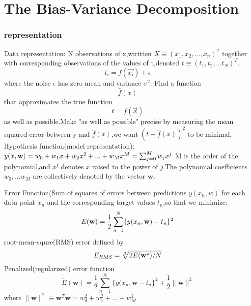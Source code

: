 \section{The Bias-Variance Decomposition}
\subsubsection{representation}
Data representation:
N observations of x,wiritten 
$X \equiv (x_1,x_2,...,x_n)^T$
together with corresponding observations of the values of t,denoted 
$t \equiv (t_1,t_2,...t_N)^T$.
\begin{equation}
t_i = f(\vec{x_i}) + \epsilon 
\end{equation}
where the noise $ \epsilon $ has zero mean and variance $ \sigma^2 $.
Find a function \[ \hat{f}(x) \] that approximates the true function \[ t = f(\vec{x}) \] as well as possible.Make "as well as possible" precise  by measuring the mean squared error between y and $ \hat{f}(x) $,we want $ (t - \hat{f}(x))^2 $ to be minimal.
Hypothesis function(model representation):
$y(x,\bold w)= w_0+w_1x+w_2x^2+...+w_Mx^M = \sum_{j=0}^{M}w_jx^j$
M is the order of the polynomial,and $x^j$ denotes $x$ raised to the power of $j$.The polynomial coefficients $w_0,...w_M$ are
collectively denoted by the vector $\mathbf{w}$.

Error Function(Sum of squares of errors between predictions $y(x_n,w)$ for each data point $x_n$ and the corresponding target values $t_n$,so that we minimize:
\begin{equation}
E(\bold w)=\frac{1}{2}\sum_{n=1}^{N}\{y(x_n,\bold w)-t_n \}^2
\end{equation}
root-mean-squre(RMS) error defined by
\begin{equation} 
E_{RMS} = \sqrt[2]{2E(\bold w^*)/N}
\end{equation}
Penalized(regularized) error function
\begin{equation}
\widetilde{E}(\textbf{w}) = \frac{1}{2}\sum_{n=1}^{N}\{y(x_n,\textbf{w}-t_n\}^2 + \frac{1}{2} \parallel \textbf{w} \parallel^2
\end{equation}
where $\parallel \textbf{w} \parallel^2 \equiv \textbf{w}^T\textbf{w}=w_0^2+w_1^2+...+w_M^2$

